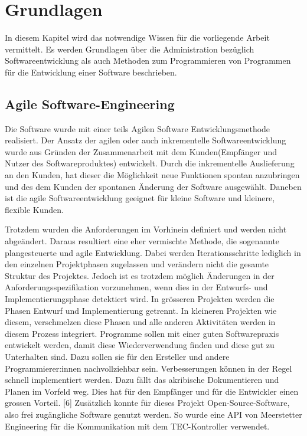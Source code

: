 
\section{Grundlagen}
In diesem Kapitel wird das notwendige Wissen für die vorliegende Arbeit vermittelt. Es werden Grundlagen über die Administration bezüglich Softwareentwicklung als auch Methoden zum Programmieren von Programmen für die Entwicklung einer Software beschrieben.\\

\subsection{Agile Software-Engineering}
Die Software wurde mit einer teils Agilen Software Entwicklungsmethode realisiert. Der Ansatz der agilen oder auch inkrementelle Softwareentwicklung wurde aus Gründen der Zusammenarbeit mit dem Kunden(Empfänger und Nutzer des Softwareproduktes) entwickelt. Durch die inkrementelle Auslieferung an den Kunden, hat dieser die Möglichkeit neue Funktionen spontan anzubringen und des dem Kunden der spontanen Änderung der Software ausgewählt. Daneben ist die agile Softwareentwicklung geeignet für kleine Software und kleinere, flexible Kunden.

Trotzdem wurden die Anforderungen im Vorhinein definiert und werden nicht abgeändert. Daraus resultiert eine eher vermischte Methode, die sogenannte plangesteuerte und agile Entwicklung. Dabei werden Iterationsschritte lediglich in den einzelnen Projektphasen zugelassen und verändern nicht die gesamte Struktur des Projektes. Jedoch ist es trotzdem möglich Änderungen in der Anforderungsspezifikation vorzunehmen, wenn dies in der Entwurfs- und Implementierungsphase detektiert wird. In grösseren Projekten werden die Phasen Entwurf und Implementierung getrennt. In kleineren Projekten wie diesem, verschmelzen diese Phasen und alle anderen Aktivitäten werden in diesem Prozess integriert. Programme sollen mit einer guten Softwarepraxis entwickelt werden, damit diese Wiederverwendung finden und diese gut zu Unterhalten sind. Dazu sollen sie für den Ersteller und andere Programmierer:innen nachvollziehbar sein.
Verbesserungen können in der Regel schnell implementiert werden. Dazu fällt das akribische Dokumentieren und Planen im Vorfeld weg. Dies hat für den Empfänger und für die Entwickler einen grossen Vorteil. [6] %
Zusätzlich konnte für dieses Projekt Open-Source-Software, also frei zugängliche Software genutzt werden. So wurde eine API von Meerstetter Engineering für die Kommunikation mit dem TEC-Kontroller verwendet.

